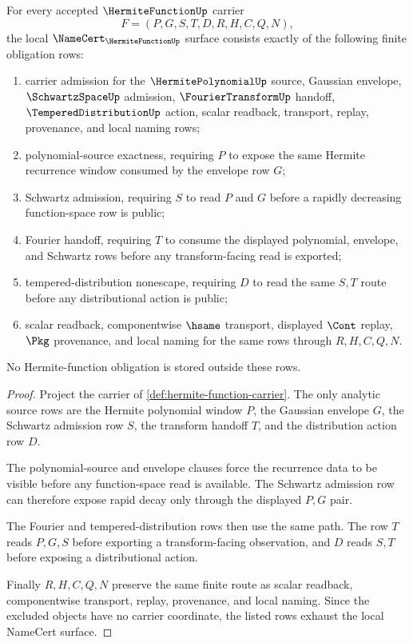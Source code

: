 \begin{theorem}
\label{thm:hermite-function-namecert-obligations}
For every accepted $\HermiteFunctionUp$ carrier
$$
F=(P,G,S,T,D,R,H,C,Q,N),
$$
the local $\NameCert_{\HermiteFunctionUp}$ surface consists exactly of the following finite obligation rows:
\begin{enumerate}
\item carrier admission for the $\HermitePolynomialUp$ source, Gaussian envelope, $\SchwartzSpaceUp$ admission, $\FourierTransformUp$ handoff, $\TemperedDistributionUp$ action, scalar readback, transport, replay, provenance, and local naming rows;
\item polynomial-source exactness, requiring $P$ to expose the same Hermite recurrence window consumed by the envelope row $G$;
\item Schwartz admission, requiring $S$ to read $P$ and $G$ before a rapidly decreasing function-space row is public;
\item Fourier handoff, requiring $T$ to consume the displayed polynomial, envelope, and Schwartz rows before any transform-facing read is exported;
\item tempered-distribution nonescape, requiring $D$ to read the same $S,T$ route before any distributional action is public;
\item scalar readback, componentwise $\hsame$ transport, displayed $\Cont$ replay, $\Pkg$ provenance, and local naming for the same rows through $R,H,C,Q,N$.
\end{enumerate}
No Hermite-function obligation is stored outside these rows.
\end{theorem}
\begin{proof}
Project the carrier of \autoref{def:hermite-function-carrier}. The only analytic source rows are the Hermite polynomial window $P$, the Gaussian envelope $G$, the Schwartz admission row $S$, the transform handoff $T$, and the distribution action row $D$.

The polynomial-source and envelope clauses force the recurrence data to be visible before any function-space read is available. The Schwartz admission row can therefore expose rapid decay only through the displayed $P,G$ pair.

The Fourier and tempered-distribution rows then use the same path. The row $T$ reads $P,G,S$ before exporting a transform-facing observation, and $D$ reads $S,T$ before exposing a distributional action.

Finally $R,H,C,Q,N$ preserve the same finite route as scalar readback, componentwise transport, replay, provenance, and local naming. Since the excluded objects have no carrier coordinate, the listed rows exhaust the local NameCert surface.
\end{proof}


